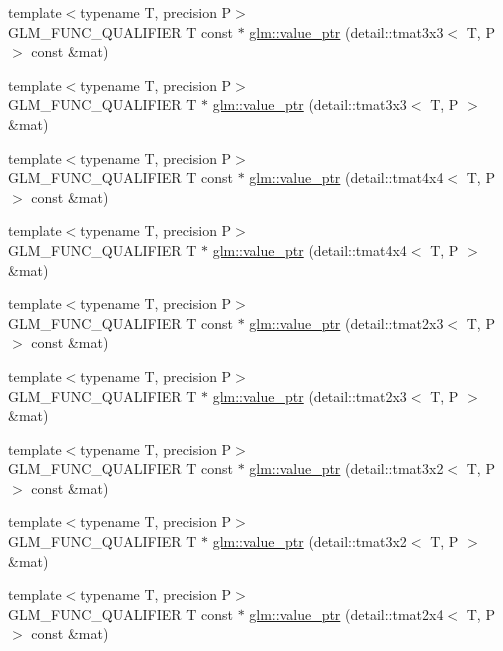 \begin{CompactItemize}
\item 
{\footnotesize template$<$typename T, precision P$>$ }\\GLM\_\-FUNC\_\-QUALIFIER T const $\ast$ \hyperlink{group__gtc__type__ptr_g78aceb3dc479cf7745bc5a0d9f751504}{glm::value\_\-ptr} (detail::tmat3x3$<$ T, P $>$ const \&mat)
\item 
{\footnotesize template$<$typename T, precision P$>$ }\\GLM\_\-FUNC\_\-QUALIFIER T $\ast$ \hyperlink{group__gtc__type__ptr_ge90c54e1a61d5ad0417d3c1a7800dfdc}{glm::value\_\-ptr} (detail::tmat3x3$<$ T, P $>$ \&mat)
\item 
{\footnotesize template$<$typename T, precision P$>$ }\\GLM\_\-FUNC\_\-QUALIFIER T const $\ast$ \hyperlink{group__gtc__type__ptr_gcb2a7024434ab32998c6ade8ec0c0e4b}{glm::value\_\-ptr} (detail::tmat4x4$<$ T, P $>$ const \&mat)
\item 
{\footnotesize template$<$typename T, precision P$>$ }\\GLM\_\-FUNC\_\-QUALIFIER T $\ast$ \hyperlink{group__gtc__type__ptr_g5f34b63d9c6322a3a61f15ee63768304}{glm::value\_\-ptr} (detail::tmat4x4$<$ T, P $>$ \&mat)
\item 
{\footnotesize template$<$typename T, precision P$>$ }\\GLM\_\-FUNC\_\-QUALIFIER T const $\ast$ \hyperlink{group__gtc__type__ptr_g76ad4707fac9af56b7eaea2c9b6019fb}{glm::value\_\-ptr} (detail::tmat2x3$<$ T, P $>$ const \&mat)
\item 
{\footnotesize template$<$typename T, precision P$>$ }\\GLM\_\-FUNC\_\-QUALIFIER T $\ast$ \hyperlink{group__gtc__type__ptr_g12dda3f2717411f15a1a317a82113f14}{glm::value\_\-ptr} (detail::tmat2x3$<$ T, P $>$ \&mat)
\item 
{\footnotesize template$<$typename T, precision P$>$ }\\GLM\_\-FUNC\_\-QUALIFIER T const $\ast$ \hyperlink{group__gtc__type__ptr_g3ad2904b61a8c3fe50ccb6222e6e928c}{glm::value\_\-ptr} (detail::tmat3x2$<$ T, P $>$ const \&mat)
\item 
{\footnotesize template$<$typename T, precision P$>$ }\\GLM\_\-FUNC\_\-QUALIFIER T $\ast$ \hyperlink{group__gtc__type__ptr_gd4e46790704d514a05d86164af942d72}{glm::value\_\-ptr} (detail::tmat3x2$<$ T, P $>$ \&mat)
\item 
{\footnotesize template$<$typename T, precision P$>$ }\\GLM\_\-FUNC\_\-QUALIFIER T const $\ast$ \hyperlink{group__gtc__type__ptr_g9efd0cc6b3e12ec8953d9a96e8b750b0}{glm::value\_\-ptr} (detail::tmat2x4$<$ T, P $>$ const \&mat)

\end{CompactItemize}
